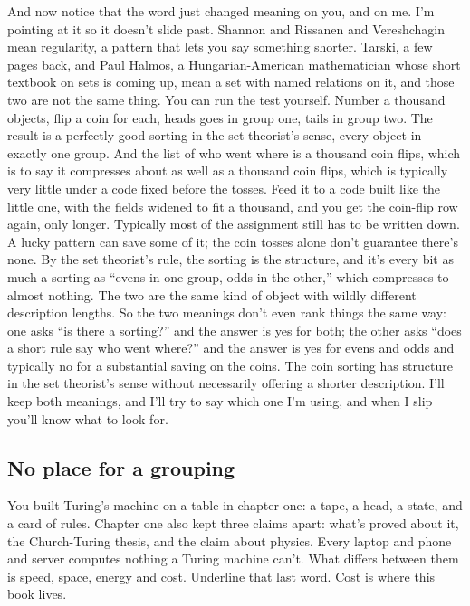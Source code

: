 \documentclass[11pt,twoside]{article}
\theoremstyle{thielethm}
\theoremstyle{thieledef}
\theoremstyle{thieledef}
\theoremstyle{thieledef}
\theoremstyle{thielethm}
\theoremstyle{thieleobs}
\theoremstyle{thielethm}
\begin{document}
And now notice that the word just changed meaning on you, and on me. I'm pointing at it so it doesn't slide past. Shannon and Rissanen and Vereshchagin mean regularity, a pattern that lets you say something shorter. Tarski, a few pages back, and Paul Halmos, a Hungarian-American mathematician whose short textbook on sets is coming up, mean a set with named relations on it, and those two are not the same thing. You can run the test yourself. Number a thousand objects, flip a coin for each, heads goes in group one, tails in group two. The result is a perfectly good sorting in the set theorist's sense, every object in exactly one group. And the list of who went where is a thousand coin flips, which is to say it compresses about as well as a thousand coin flips, which is typically very little under a code fixed before the tosses. Feed it to a code built like the little one, with the fields widened to fit a thousand, and you get the coin-flip row again, only longer. Typically most of the assignment still has to be written down. A lucky pattern can save some of it; the coin tosses alone don't guarantee there's none. By the set theorist's rule, the sorting is the structure, and it's every bit as much a sorting as ``evens in one group, odds in the other,'' which compresses to almost nothing. The two are the same kind of object with wildly different description lengths. So the two meanings don't even rank things the same way: one asks ``is there a sorting?'' and the answer is yes for both; the other asks ``does a short rule say who went where?'' and the answer is yes for evens and odds and typically no for a substantial saving on the coins. The coin sorting has structure in the set theorist's sense without necessarily offering a shorter description. I'll keep both meanings, and I'll try to say which one I'm using, and when I slip you'll know what to look for.

\subsection{No place for a grouping}

You built Turing's machine on a table in chapter one: a tape, a head, a state, and a card of rules. Chapter one also kept three claims apart: what's proved about it, the Church-Turing thesis, and the claim about physics. Every laptop and phone and server computes nothing a Turing machine can't. What differs between them is speed, space, energy and cost. Underline that last word. Cost is where this book lives.
\end{document}
